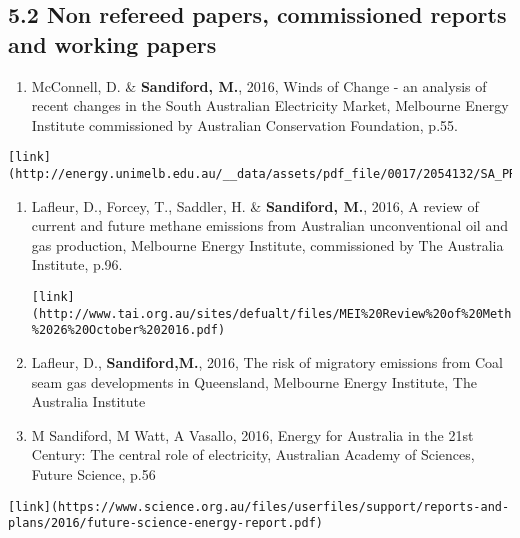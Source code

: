 \documentclass[
]{article}
\providecommand{\tightlist}{%
  \setlength{\itemsep}{0pt}\setlength{\parskip}{0pt}}
\begin{document}
\hypertarget{non-refereed-papers-commissioned-reports-and-working-papers}{%
\subsection{5.2 Non refereed papers, commissioned reports and working
papers}\label{non-refereed-papers-commissioned-reports-and-working-papers}}

\begin{enumerate}
\def\labelenumi{\arabic{enumi}.}
\tightlist
\item
  McConnell, D. \& \textbf{Sandiford, M.}, 2016, Winds of Change - an
  analysis of recent changes in the South Australian Electricity Market,
  Melbourne Energy Institute commissioned by Australian Conservation
  Foundation, p.55.
\end{enumerate}

\begin{verbatim}
[link](http://energy.unimelb.edu.au/__data/assets/pdf_file/0017/2054132/SA_PRICES_FINAL.pdf)
\end{verbatim}

\begin{enumerate}
\def\labelenumi{\arabic{enumi}.}
\item
  Lafleur, D., Forcey, T., Saddler, H. \& \textbf{Sandiford, M.}, 2016,
  A review of current and future methane emissions from Australian
  unconventional oil and gas production, Melbourne Energy Institute,
  commissioned by The Australia Institute, p.96.

\begin{verbatim}
[link](http://www.tai.org.au/sites/defualt/files/MEI%20Review%20of%20Methane%20Emissions%20-%2026%20October%202016.pdf)
\end{verbatim}
\item
  Lafleur, D., \textbf{Sandiford,M.}, 2016, The risk of migratory
  emissions from Coal seam gas developments in Queensland, Melbourne
  Energy Institute, The Australia Institute
\item
  M Sandiford, M Watt, A Vasallo, 2016, Energy for Australia in the 21st
  Century: The central role of electricity, Australian Academy of
  Sciences, Future Science, p.56
\end{enumerate}

\begin{verbatim}
[link](https://www.science.org.au/files/userfiles/support/reports-and-plans/2016/future-science-energy-report.pdf)
\end{verbatim}
\end{document}
